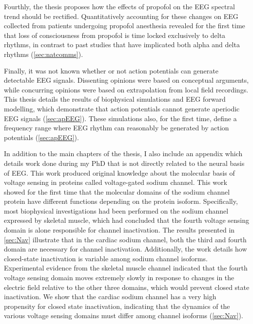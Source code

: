 Fourthly, the thesis proposes how the effects of propofol on the EEG spectral trend should be rectified. Quantitatively accounting for these changes on EEG collected from patients undergoing propofol anesthesia revealed for the first time that loss of consciousness from propofol is time locked exclusively to delta rhythms, in contrast to past studies that have implicated both alpha and delta rhythms  (\autoref{sec:natcomms}).

Finally, it was not known whether or not action potentials can generate detectable EEG signals. Dissenting opinions were based on conceptual arguments, while concurring opinions were based on extrapolation from local field recordings. This thesis details the results of biophysical simulations and EEG forward modelling, which demonstrate that action potentials cannot generate aperiodic EEG signals (\autoref{sec:apEEG}). These simulations also, for the first time, define a frequency range where EEG rhythm can reasonably be generated by action potentials (\autoref{sec:apEEG}).

In addition to the main chapters of the thesis, I also include an appendix which details work done during my PhD that is not directly related to the neural basis of EEG. This work produced original knowledge about the molecular basis of voltage sensing in proteins called voltage-gated sodium channel. This work showed for the first time that the molecular domains of the sodium channel protein have different functions depending on the protein isoform. Specifically, most biophysical investigations had been performed on the sodium channel expressed by skeletal muscle, which had concluded that the fourth voltage sensing domain is alone responsible for channel inactivation. The results presented in \autoref{sec:Nav} illustrate that in the cardiac sodium channel, both the third and fourth domain are necessary for channel inactivation. Additionally, the work details how closed-state inactivation is variable among sodium channel isoforms. Experimental evidence from the skeletal muscle channel indicated that the fourth voltage sensing domain moves extremely slowly in response to changes in the electric field relative to the other three domains, which would prevent closed state inactivation. We show that the cardiac sodium channel has a very high propensity for closed state inactivation, indicating that the dynamics of the various voltage sensing domains must differ among channel isoforms (\autoref{sec:Nav}).

